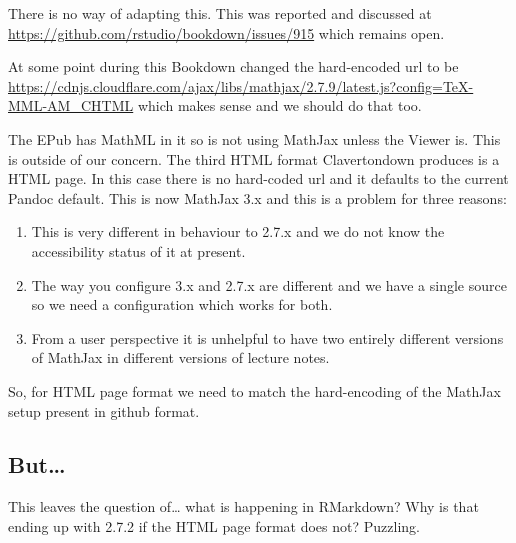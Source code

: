 \documentclass[
  12pt,
  a4paper]{extarticle}
\providecommand{\tightlist}{%
  \setlength{\itemsep}{0pt}\setlength{\parskip}{0pt}}
\renewcommand{\;}{\,}
\begin{document}
There is no way of adapting this. This was reported and discussed at \url{https://github.com/rstudio/bookdown/issues/915} which remains open.

At some point during this Bookdown changed the hard-encoded url to be \url{https://cdnjs.cloudflare.com/ajax/libs/mathjax/2.7.9/latest.js?config=TeX-MML-AM_CHTML} which makes sense and we should do that too.

The EPub has MathML in it so is not using MathJax unless the Viewer is. This is outside of our concern. The third HTML format Clavertondown produces is a HTML page. In this case there is no hard-coded url and it defaults to the current Pandoc default. This is now MathJax 3.x and this is a problem for three reasons:

\begin{enumerate}
\def\labelenumi{\arabic{enumi}.}
\tightlist
\item
  This is very different in behaviour to 2.7.x and we do not know the accessibility status of it at present.
\item
  The way you configure 3.x and 2.7.x are different and we have a single source so we need a configuration which works for both.
\item
  From a user perspective it is unhelpful to have two entirely different versions of MathJax in different versions of lecture notes.
\end{enumerate}

So, for HTML page format we need to match the hard-encoding of the MathJax setup present in github format.

\hypertarget{but}{%
\subsection{But\ldots{}}\label{but}}

This leaves the question of\ldots{} what is happening in RMarkdown? Why is that ending up with 2.7.2 if the HTML page format does not? Puzzling.
\end{document}

